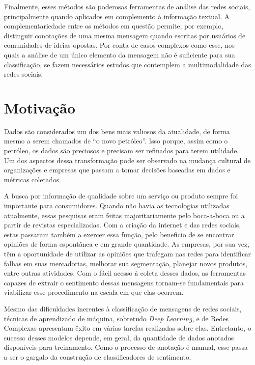 Finalmente, esses métodos são poderosas ferramentas de análise das redes sociais,
principalmente quando aplicados em complemento à informação textual.
A complementariedade entre os métodos em questão permite, por exemplo, distinguir
conotações de uma mesma mensagem quando escritas por usuários de comunidades de
ideias opostas.
Por conta de casos complexos como esse, nos quais a análise de um único elemento
da mensagem não é suficiente para sua classificação, se fazem necessários
estudos que contemplem a multimodalidade das redes sociais.

\section{Motivação}

Dados são considerados um dos bens mais valiosos da atualidade, de forma mesmo a
serem chamados de ``o novo petróleo''.
Isso porque, assim como o petróleo, os dados são preciosos e precisam ser refinados
para terem utilidade.
Um dos aspectos dessa transformação pode ser observado na mudança cultural de
organizações e empresas que passam a tomar decisões baseadas em dados e métricas
coletados.

A busca por informação de qualidade sobre um serviço ou produto sempre foi
importante para consumidores.
Quando não havia as tecnologias utilizadas atualmente, essas pesquisas eram feitas
majoritariamente pelo boca-a-boca ou a partir de revistas especializadas.
Com a criação da internet e das redes sociais, estas passaram também a exercer
essa função, pelo beneficio de se encontrar opiniões de forma espontânea e em
grande quantidade.
As empresas, por sua vez, têm a oportunidade de utilizar as opiniões que
trafegam nas redes para identificar falhas em suas mercadorias, melhorar sua
segmentação, planejar novos produtos, entre outras atividades.
Com o fácil acesso à coleta desses dados, as ferramentas capazes de extrair o
sentimento dessas mensagens tornam-se fundamentais para viabilizar esse
procedimento na escala em que elas ocorrem.

Mesmo das dificuldades inerentes à classificação de mensagens de redes sociais,
técnicas de aprendizado de máquina, sobretudo \textit{Deep Learning}, e de Redes
Complexas apresentam êxito em várias tarefas realizadas sobre elas.
Entretanto, o sucesso desses modelos depende, em geral, da quantidade de dados
anotados disponíveis para treinamento.
Como o processo de anotação é manual, esse passa a ser o gargalo da construção de
classificadores de sentimento.

